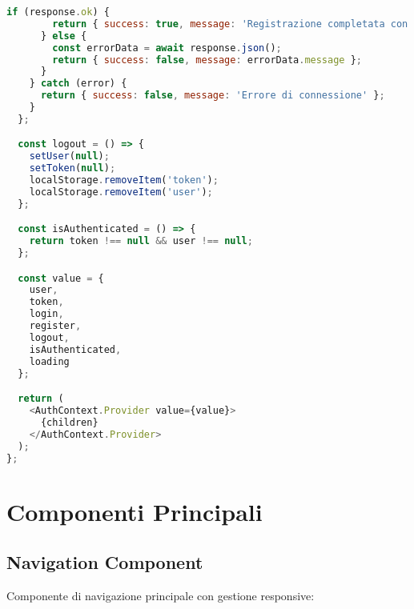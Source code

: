 \documentclass[12pt,a4paper]{report}
\begin{document}
\begin{lstlisting}[language=JavaScript, caption=AuthContext.js - Authentication Management]
      if (response.ok) {
        return { success: true, message: 'Registrazione completata con successo' };
      } else {
        const errorData = await response.json();
        return { success: false, message: errorData.message };
      }
    } catch (error) {
      return { success: false, message: 'Errore di connessione' };
    }
  };

  const logout = () => {
    setUser(null);
    setToken(null);
    localStorage.removeItem('token');
    localStorage.removeItem('user');
  };

  const isAuthenticated = () => {
    return token !== null && user !== null;
  };

  const value = {
    user,
    token,
    login,
    register,
    logout,
    isAuthenticated,
    loading
  };

  return (
    <AuthContext.Provider value={value}>
      {children}
    </AuthContext.Provider>
  );
};
\end{lstlisting}

\section{Componenti Principali}

\subsection{Navigation Component}

Componente di navigazione principale con gestione responsive:
\end{document}
